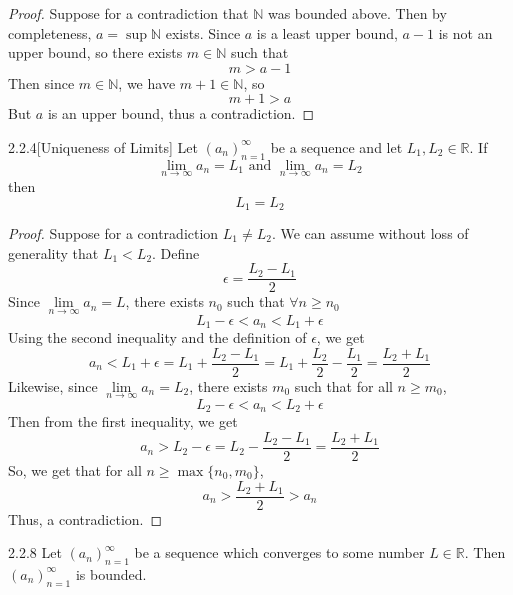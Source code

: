 \documentclass[openany]{report}
\begin{document}
    \begin{proof}
    Suppose for a contradiction that $\mathbb{N}$ was bounded above. Then by completeness, $a = \sup \mathbb{N}$ exists. Since $a$ is a least upper bound, $a - 1$ is not an upper bound, so there exists $m \in \mathbb{N}$ such that 
    \[m > a - 1\]
    Then since $m \in \mathbb{N}$, we have $m + 1 \in \mathbb{N}$, so 
    \[m + 1 > a\]
    But $a$ is an upper bound, thus a contradiction. 
    \end{proof}
    \begin{manualprop}{2.2.4}[Uniqueness of Limits]
    Let $(a_n)_{n=1}^\infty$ be a sequence and let $L_1, L_2 \in \mathbb{R}$. If 
    \[\lim_{n\rightarrow\infty} a_n = L_1 \text{ and } \lim_{n\rightarrow\infty} a_n = L_2\]
    then 
    \[L_1 = L_2\]
    \end{manualprop}
    \begin{proof}
        Suppose for a contradiction $L_1 \neq L_2$. We can assume without loss of generality that $L_1 < L_2$. Define 
        \[\epsilon = \frac{L_2 - L_1}{2}\]
        Since $\lim\limits_{n\rightarrow\infty} a_n = L$, there exists $n_0$ such that $\forall n \geq n_0$
        \[L_1 - \epsilon < a_n < L_1 + \epsilon\]
        Using the second inequality and the definition of $\epsilon$, we get
        \[a_n < L_1 + \epsilon = L_1 + \frac{L_2 - L_1}{2} = L_1 + \frac{L_2}{2} - \frac{L_1}{2} = \frac{L_2 + L_1}{2}\]
        Likewise, since $\lim\limits_{n\rightarrow\infty} a_n = L_2$, there exists $m_0$ such that for all $n \geq m_0$, 
        \[L_2 - \epsilon < a_n < L_2 + \epsilon\]
        Then from the first inequality, we get
        \[a_n > L_2 - \epsilon = L_2 - \frac{L_2 - L_1}{2} = \frac{L_2 + L_1}{2}\]
        So, we get that for all $n \geq \max\{n_0, m_0\}$, 
        \[a_n > \frac{L_2 + L_1}{2} > a_n\]
        Thus, a contradiction.
    \end{proof}
    \begin{manualprop}{2.2.8}
        Let $(a_n)_{n=1}^\infty$ be a sequence which converges to some number $L \in \mathbb{R}$. Then $(a_n)_{n=1}^\infty$ is bounded.
    \end{manualprop}
\end{document}
